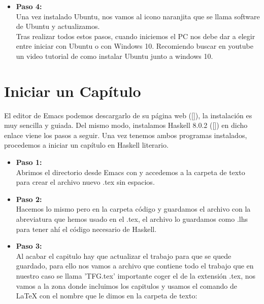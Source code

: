 \begin{itemize}
\item \textbf{Paso 4:}\\
Una vez instalado Ubuntu, nos vamos al icono naranjita que se llama software de Ubuntu y actualizamos.\\

Tras realizar todos estos pasos, cuando iniciemos el PC nos debe dar a elegir entre iniciar con Ubuntu o con Windows 10. Recomiendo buscar en youtube un video tutorial de como instalar Ubuntu junto a windows 10.\\
\end{itemize}

\section{Iniciar un Capítulo}

El editor de Emacs podemos descargarlo de su página web ([]), la instalación es muy sencilla y guiada. Del mismo modo, instalamos Haskell 8.0.2 ([]) en dicho enlace viene los pasos a seguir. Una vez tenemos ambos programas instalados, procedemos a iniciar un capítulo en Haskell literario.
\begin{itemize}

\item \textbf{Paso 1:}\\
Abrimos el directorio desde Emacs con  y accedemos a la carpeta de texto para crear el archivo nuevo .tex sin espacios.\\

\item \textbf{Paso 2:}\\
Hacemos lo mismo pero en la carpeta código y guardamos el archivo con la abreviatura que hemos usado en el .tex, el archivo lo guardamos como .lhs para tener ahí el código necesario de Haskell. \\

\item \textbf{Paso 3:}\\
Al acabar el capitulo hay que actualizar el trabajo para que se quede guardado, para ello nos vamos a archivo que contiene todo el trabajo que en nuestro caso se llama 'TFG.tex' importante coger el de la extensión .tex, nos vamos a la zona donde incluimos los capitulos y usamos el comando de LaTeX con el nombre que le dimos en la carpeta de texto:\\

\\

\end{itemize}

